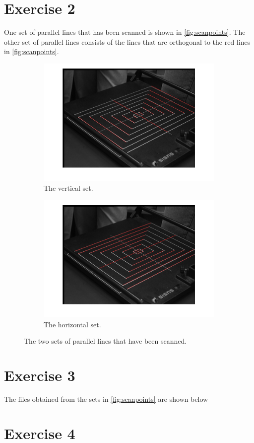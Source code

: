 \documentclass[a4paper]{article}
\begin{document}
\section*{Exercise 2}
One set of parallel lines that has been scanned is shown in \autoref{fig:scanpoints}. The other set of parallel lines consists of the lines that are orthogonal to the red lines in \autoref{fig:scanpoints}.
\begin{figure}[h]
	\centering
	\begin{subfigure}[t]{.49\textwidth}
		\includegraphics[width=\textwidth]{par_lines}
		\caption{The vertical set.}
	\end{subfigure}
	\begin{subfigure}[t]{.49\textwidth}
		\includegraphics[width=\textwidth]{par_lines2}
		\caption{The horizontal set.}
	\end{subfigure}
	\caption{The two sets of parallel lines that have been scanned.}
	\label{fig:scanpoints}
\end{figure}

\section*{Exercise 3}
The files obtained from the sets in \autoref{fig:scanpoints} are shown below



\section*{Exercise 4}
\end{document}
